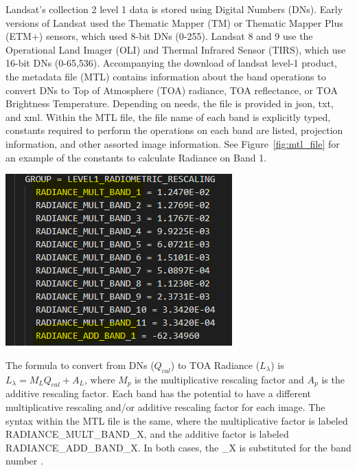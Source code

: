 \documentclass[12pt, letterpaper]{article}
\begin{document}
\begin{enumerate}
    Landsat's collection 2 level 1 data is stored using Digital Numbers (DNs). Early versions of Landsat used the Thematic Mapper (TM) or Thematic Mapper Plus (ETM+) sensors, which used 8-bit DNs (0-255). Landsat 8 and 9 use the Operational Land Imager (OLI) and Thermal Infrared Sensor (TIRS), which use 16-bit DNs (0-65,536). Accompanying the download of landsat level-1 product, the metadata file (MTL) contains information about the band operations to convert DNs to Top of Atmosphere (TOA) radiance, TOA reflectance, or TOA Brightness Temperature. Depending on needs, the file is provided in json, txt, and xml. Within the MTL file, the file name of each band is explicitly typed, constants required to perform the operations on each band are listed, projection information, and other assorted image information. See Figure~\ref{fig:mtl_file} for an example of the constants to calculate Radiance on Band 1.
    \begin{center}
        \includegraphics[scale=.7]{mtl_file.png}
        \label{fig:mtl_file}
    \end{center}
    
    The formula to convert from DNs ($Q_{cal}$) to TOA Radiance ($L_{\lambda}$) is $L_{\lambda} = M_LQ_{cal} + A_L$, where $M_p$ is the multiplicative rescaling factor and $A_p$ is the additive rescaling factor. Each band has the potential to have a different multiplicative rescaling and/or additive rescaling factor for each image. The syntax within the MTL file is the same, where the multiplicative factor is labeled RADIANCE\_MULT\_BAND\_X, and the additive factor is labeled RADIANCE\_ADD\_BAND\_X. In both cases, the \_X is substituted for the band number \cite{landsat_level1}.


\end{enumerate}
\end{document}
